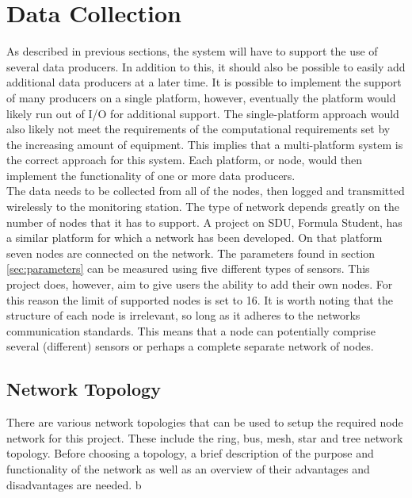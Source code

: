 
\section{Data Collection}
\label{sec:data_collection}
As described in previous sections, the system will have to support the use of several data producers.
In addition to this, it should also be possible to easily add additional data producers at a later time.
It is possible to implement the support of many producers on a single platform, however, eventually the platform would likely run out of I/O for additional support.
The single-platform approach would also likely not meet the requirements of the computational requirements set by the increasing amount of equipment.
This implies that a multi-platform system is the correct approach for this system.
Each platform, or node, would then implement the functionality of one or more data producers.\\
The data needs to be collected from all of the nodes, then logged and transmitted wirelessly to the monitoring station.
The type of network depends greatly on the number of nodes that it has to support.
A project on SDU, Formula Student, has a similar platform for which a network has been developed.
On that platform seven nodes are connected on the network.
The parameters found in section \ref{sec:parameters} can be measured using five different types of sensors.
This project does, however, aim to give users the ability to add their own nodes.
For this reason the limit of supported nodes is set to 16.
It is worth noting that the structure of each node is irrelevant, so long as it adheres to the networks communication standards.
This means that a node can potentially comprise several (different) sensors or perhaps a complete separate network of nodes.

\subsection{Network Topology}

There are various network topologies that can be used to setup the required node network for this project.
These include the ring, bus, mesh, star and tree network topology. 
Before choosing a topology, a brief description of the purpose and functionality of the network as well as an overview of their advantages and disadvantages are needed. 
b
